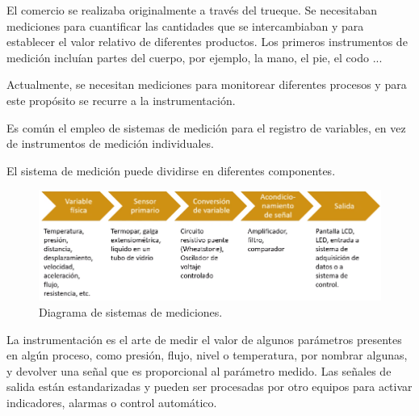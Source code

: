 \documentclass[12pt, letterpaper]{extarticle}
\begin{document}


\newpage

\tableofcontents

\newpage




El comercio se realizaba originalmente a través del trueque. Se necesitaban mediciones para cuantificar las cantidades que se intercambiaban y para establecer el valor relativo de diferentes productos. Los primeros instrumentos de medición incluían partes del cuerpo, por ejemplo, la mano, el pie, el codo ...

Actualmente, se necesitan mediciones para monitorear diferentes procesos y para este propósito se recurre a la instrumentación.

Es común el empleo de sistemas de medición para el registro de variables, en vez de instrumentos de medición individuales.

El sistema de medición puede dividirse en diferentes componentes.


\begin{figure}[h]
    \centering
    \includegraphics[width=\textwidth]{Media/diagrama_sistemas_de_mediciones.png}
    \caption{Diagrama de sistemas de mediciones.}
    \label{Fig: Diagrama de sistemas de mediciones}
\end{figure}


La instrumentación es el arte de medir el valor de algunos parámetros presentes en algún proceso, como presión, flujo, nivel o temperatura, por nombrar algunas, y devolver una señal que es proporcional al parámetro medido. Las señales de salida están estandarizadas y pueden ser procesadas por otro equipos para activar indicadores, alarmas o control automático.
\end{document}
